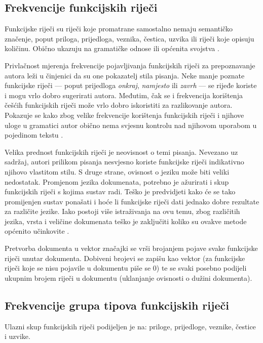 \documentclass[11pt,english]{article}
\begin{document}
\begin{multicols}{2}
\subsection{Frekvencije funkcijskih riječi}
\label{sec:funkcijske-rijeci}
Funkcijske riječi su riječi koje promatrane samostalno nemaju semantičko
značenje, poput priloga, prijedloga, veznika, čestica, uzvika ili riječi koje
opisuju količinu. Obično ukazuju na gramatičke odnose ili općenita svojstva
\citep{zhao2005effective}.

Privlačnost mjerenja frekvencije pojavljivanja funkcijskih riječi za
prepoznavanje autora leži u činjenici da su one pokazatelj stila pisanja. Neke
manje poznate funkcijske riječi --- poput prijedloga \emph{onkraj},
\emph{namjesto} ili \emph{zavrh} --- se rijeđe koriste i mogu vrlo dobro
sugerirati autora. Međutim, čak se i frekvencija korištenja češćih funkcijskih
riječi može vrlo dobro iskoristiti za razlikovanje autora. Pokazuje se kako zbog
velike frekvencije korištenja funkcijskih riječi i njihove uloge u gramatici
autor obično nema svjesnu kontrolu nad njihovom uporabom u pojedinom tekstu
\citep{argamon2005measuring}.

Velika prednost funkcijskih riječi je neovisnost o temi pisanja. Nevezano uz
sadržaj, autori prilikom pisanja nesvjesno koriste funkcijske riječi indikativno
njihovo vlastitom stilu. S druge strane, ovisnost o jeziku može biti veliki
nedostatak. Promjenom jezika dokumenata, potrebno je ažurirati i skup funkcijskih
riječi s kojima sustav radi. Teško je predvidjeti kako će se tako promijenjen
sustav ponašati i hoće li funkcijske riječi dati jednako dobre rezultate za
različite jezike. Iako postoji više istraživanja na ovu temu, zbog različitih
jezika, vrsta i veličine dokumenata teško je zaključiti koliko su ovakve metode
općenito učinkovite \citep{zhao2005effective}.

Pretvorba dokumenta u vektor značajki se vrši brojanjem pojave svake funkcijske
riječi unutar dokumenta. Dobiveni brojevi se zapišu kao vektor (za funkcijske
riječi koje se nisu pojavile u dokumentu piše se 0) te se svaki posebno podijeli
ukupnim brojem riječi u dokumentu (uklanjanje ovisnosti o dužini dokumenta).

\subsection{Frekvencije grupa tipova funkcijskih riječi}
\label{sec:funkcijske-rijeci-grupe}
Ulazni skup funkcijskih riječi podijeljen je na: priloge, prijedloge, veznike,
čestice i uzvike.


\end{multicols}
\end{document}
